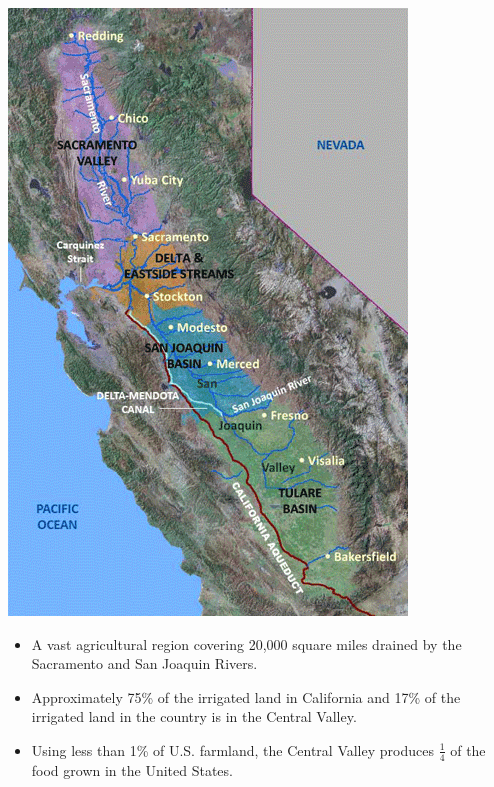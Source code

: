 \documentclass[oneside,a4paper,11pt,explicit]{book}
\begin{document}
\begin{tcolorbox}[colback=yellow!5!white,colframe=IceCreamLeaf,title=\textbf{California's Central Valley}]
	\begin{multicols}{2}

	\centerline{\includegraphics[width=\columnwidth]{CentralValleyUSGS.png}}
	\columnbreak
		\begin{itemize}
			\item A vast agricultural region covering 20,000 square miles drained by the Sacramento and San Joaquin Rivers.
			\item Approximately 75\% of the irrigated land in California and 17\% of the irrigated land in the country is in the Central Valley.
			\item Using less than 1\% of U.S. farmland, the Central Valley produces $\frac{1}{4}$ of the food grown in the United States.

\end{itemize}
\end{multicols}
\end{tcolorbox}
\end{document}
